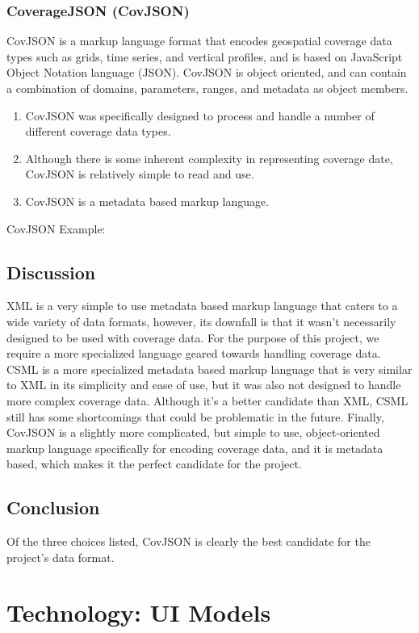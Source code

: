 \documentclass[onecolumn, draftclsnofoot,10pt, compsoc]{IEEEtran}
\begin{document}
\subsubsection{CoverageJSON (CovJSON)}
CovJSON is a markup language format that encodes geospatial coverage data types such as grids, time series, and vertical profiles, and is based on JavaScript Object Notation language (JSON). CovJSON is object oriented, and can contain a combination of domains, parameters, ranges, and metadata as object members.
\begin{enumerate}
\item CovJSON was specifically designed to process and handle a number of different coverage data types.
\item Although there is some inherent complexity in representing coverage date, CovJSON is relatively simple to read and use.
\item CovJSON is a metadata based markup language.
\end{enumerate}

CovJSON Example:


\subsection{Discussion}
XML is a very simple to use metadata based markup language that caters to a wide variety of data formats, however, its downfall is that it wasn’t necessarily designed to be used with coverage data. For the purpose of this project, we require a more specialized language geared towards handling coverage data. CSML is a more specialized metadata based markup language that is very similar to XML in its simplicity and ease of use, but it was also not designed to handle more complex coverage data. Although it’s a better candidate than XML, CSML still has some shortcomings that could be problematic in the future. Finally, CovJSON is a slightly more complicated, but simple to use, object-oriented markup language specifically for encoding coverage data, and it is metadata based, which makes it the perfect candidate for the project.

\subsection{Conclusion}
Of the three choices listed, CovJSON is clearly the best candidate for the project’s data format.

\section{Technology: UI Models}
\end{document}
